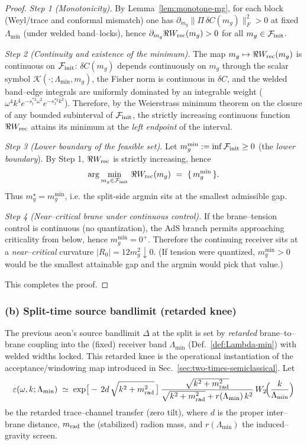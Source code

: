 \documentclass[10pt]{article}
\theoremstyle{definition}
\theoremstyle{plain}
\begin{document}
\begin{proof}
\emph{Step 1 (Monotonicity).}
By Lemma~\ref{lem:monotone-mg}, for each block (Weyl/trace and conformal mismatch) one has
$\partial_{m_g}\|\Pi\,\delta C(m_g)\|_{F}^2>0$ at fixed $\Lambda_{\min}$ (under welded band–locks),
hence $\partial_{m_g}\Re W_{\rm rec}(m_g)>0$ for all $m_g\in\mathcal F_{\rm init}$.

\emph{Step 2 (Continuity and existence of the minimum).}
The map $m_g\mapsto \Re W_{\rm rec}(m_g)$ is continuous on $\mathcal F_{\rm init}$: $\delta C(m_g)$ depends
continuously on $m_g$ through the scalar symbol $\mathcal K(\cdot;\Lambda_{\min},m_g)$, the Fisher norm is
continuous in $\delta C$, and the welded band–edge integrals are uniformly dominated by an integrable weight
($\omega^4 k^4 e^{-s_t^{{*}2}\omega^2}e^{-s_x^{{*}2}k^2}$). Therefore, by the Weierstrass minimum theorem on the closure
of any bounded subinterval of $\mathcal F_{\rm init}$, the strictly increasing continuous function $\Re W_{\rm rec}$
attains its minimum at the \emph{left endpoint} of the interval.

\emph{Step 3 (Lower boundary of the feasible set).}
Let $m_g^{\min}:=\inf \mathcal F_{\rm init}\ge 0$ (the \emph{lower boundary}). By Step 1,
$\Re W_{\rm rec}$ is strictly increasing, hence
\[
\arg\min_{m_g\in \mathcal F_{\rm init}}\,\Re W_{\rm rec}(m_g)\ =\ \{\,m_g^{\min}\,\}.
\]
Thus $m_g^\star=m_g^{\min}$, i.e. the split-side argmin sits at the smallest admissible gap.

\emph{Step 4 (Near–critical brane under continuous control).}
If the brane--tension control is continuous (no quantization), the AdS branch permits approaching
criticality from below, hence $m_g^{\min}=0^+$. Therefore the continuing receiver sits at a \emph{near--critical}
curvature $|R_0|=12 m_g^2\downarrow 0$. (If tension were quantized, $m_g^{\min}>0$ would be the smallest
attainable gap and the argmin would pick that value.)

This completes the proof.
\end{proof}

\subsubsection*{(b) Split-time source bandlimit (retarded knee)}
\label{subsubsec:init-bandlimit}
The previous aeon’s source bandlimit $\Delta$ at the split is set by \emph{retarded} brane–to–brane coupling
into the (fixed) receiver band $\Lambda_{\min}$ (Def.~\ref{def:Lambda-min}) with welded widths locked. This
retarded knee is the operational instantiation of the acceptance/windowing map introduced in
Sec.~\ref{sec:two-times-semiclassical}. Let
\begin{equation}
\label{eq:ret-kernel}
\varepsilon(\omega,k;\Lambda_{\min})
\;\simeq\; \exp\!\big[-\,2d\,\sqrt{k^2+m_{\rm rad}^2}\,\big]\,
\frac{\sqrt{k^2+m_{\rm rad}^2}}{\sqrt{k^2+m_{\rm rad}^2}+r(\Lambda_{\min})\,k^2}\,
W_2\!\Big(\frac{k}{\Lambda_{\min}}\Big)
\end{equation}
be the retarded trace–channel transfer (zero tilt), where $d$ is the proper inter–brane distance,
$m_{\rm rad}$ the (stabilized) radion mass, and $r(\Lambda_{\min})$ the induced–gravity screen.
\end{document}
